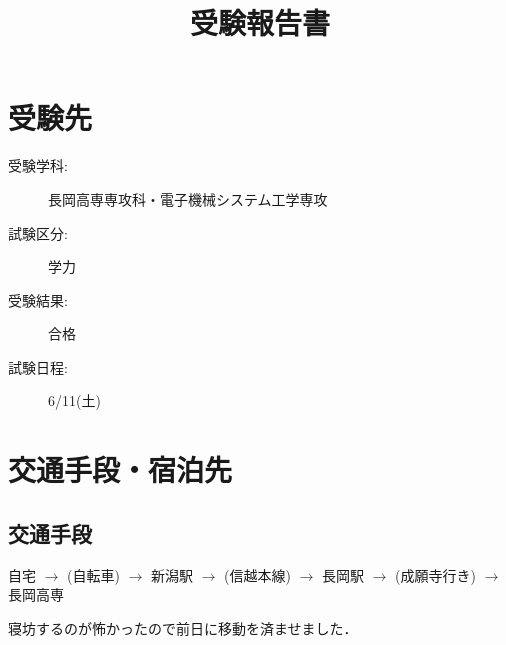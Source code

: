 \documentclass[dvipdfmx]{jsarticle}
\begin{document}
\title{受験報告書}
\author{} %
\date{}   %
\maketitle
\section{受験先}
\begin{description}
  \item[受験学科:] 長岡高専専攻科・電子機械システム工学専攻
  \item[試験区分:] 学力
  \item[受験結果:] 合格
  \item[試験日程:] 6/11(土)
\end{description}

\section{交通手段・宿泊先}

\subsection{交通手段}
自宅 $\rightarrow$ (自転車) $\rightarrow$ 新潟駅 $\rightarrow$ (信越本線)
$\rightarrow$ 長岡駅 $\rightarrow$ (成願寺行き) $\rightarrow$ 長岡高専

寝坊するのが怖かったので前日に移動を済ませました．
\end{document}
